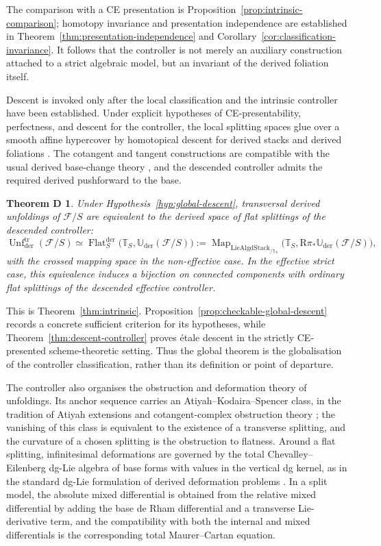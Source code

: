 \documentclass[11pt,reqno,a4paper,dvipsnames,x11names]{amsart}
\numberwithin{equation}{section}
\theoremstyle{plain}
\newtheorem*{theoremD}{Theorem D}
\theoremstyle{definition}
\theoremstyle{remark}
\DeclareMathOperator{\Map}{Map}
\newcommand{\cF}{\mathcal F}
\newcommand{\Uder}{\mathbb U_{\mathrm{der}}}
\newcommand{\bbT}{\mathbb T}
\newcommand{\tr}{\mathrm{tr}}
\begin{document}
The comparison with a CE presentation is Proposition~\ref{prop:intrinsic-comparison}; homotopy invariance and presentation independence are established in Theorem~\ref{thm:presentation-independence} and Corollary~\ref{cor:classification-invariance}. It follows that the controller is not merely an auxiliary construction attached to a strict algebraic model, but an invariant of the derived foliation itself.

\medskip
 
Descent is invoked only after the local classification and the intrinsic controller have been established. Under explicit hypotheses of CE-presentability, perfectness, and descent for the controller, the local splitting spaces glue over a smooth affine hypercover by homotopical descent for derived stacks and derived foliations \cite{HAGII,TV}. The cotangent and tangent constructions are compatible with the usual derived base-change theory \cite{IllusieI}, and the descended controller admits the required derived pushforward to the base.

\begin{theoremD} 
Under Hypothesis~\ref{hyp:global-descent}, transversal derived unfoldings of \(\cF/S\) are equivalent to the derived space of flat splittings of the descended controller:
\[
 \operatorname{Unf}^{\tr}_{\mathrm{der}}(\cF/S)
 \simeq
 \operatorname{Flat}^{\mathrm{der}}_S
 \bigl(\bbT_S,\Uder(\cF/S)\bigr)
 :=
 \Map_{\mathrm{LieAlgdStack}_{/\bbT_S}}
 \bigl(\bbT_S,\mathrm R\pi_*\Uder(\cF/S)\bigr),
\]
with the crossed mapping space in the non-effective case. In the effective strict case, this equivalence induces a bijection on connected components with ordinary flat splittings of the descended effective controller.
\end{theoremD}

This is Theorem~\ref{thm:intrinsic}. Proposition~\ref{prop:checkable-global-descent} records a concrete sufficient criterion for its hypotheses, while Theorem~\ref{thm:descent-controller} proves \'etale descent in the strictly CE-presented scheme-theoretic setting. Thus the global theorem is the globalisation of the controller classification, rather than its definition or point of departure.

\medskip
 
The controller also organises the obstruction and deformation theory of unfoldings. Its anchor sequence carries an Atiyah--Kodaira--Spencer class, in the tradition of Atiyah extensions and cotangent-complex obstruction theory \cite{Atiyah57,IllusieI}; the vanishing of this class is equivalent to the existence of a transverse splitting, and the curvature of a chosen splitting is the obstruction to flatness. Around a flat splitting, infinitesimal deformations are governed by the total Chevalley--Eilenberg dg-Lie algebra of base forms with values in the vertical dg kernel, as in the standard dg-Lie formulation of derived deformation problems \cite{Hinich01,Pridham10,Nuiten}. In a split model, the absolute mixed differential is obtained from the relative mixed differential by adding the base de Rham differential and a transverse Lie-derivative term, and the compatibility with both the internal and mixed differentials is the corresponding total Maurer--Cartan equation.
\end{document}
